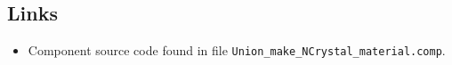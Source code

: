 \subsection*{Links}
\begin{itemize}
  \item Component source code found in file \texttt{Union\_make\_NCrystal\_material.comp}.
\end{itemize}
